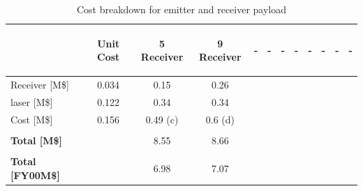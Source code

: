 \begin{table}[ht!]
\begin{tabular}{p{0.9in}|cccccccccc||c}
&\begin{sideways}Unit Cost\end{sideways} 
&\begin{sideways}5 Receiver\end{sideways} 
&\begin{sideways}9 Receiver\end{sideways} 
&\begin{sideways}-\end{sideways} 
&\begin{sideways}-\end{sideways}
&\begin{sideways}-\end{sideways} 
&\begin{sideways}-\end{sideways} 
&\begin{sideways}-\end{sideways} 
&\begin{sideways}-\end{sideways} 
&\begin{sideways}-\end{sideways}
&\begin{sideways}-\end{sideways}\\\hline
Receiver [M\$] &0.034 &0.15 &0.26 & & & & & & & & \\
\acs{laser} [M\$] &0.122 &0.34 &0.34 & & & & & & & & \\\hline\hline
Cost [M\$] &0.156 &0.49 (c) &0.6 (d) & & & & & & & &\\\hline\hline\\
\textbf{Total [M\$]} & &8.55 &8.66 & & & & & & & &\\\hline\\
\textbf{Total [FY00M\$]} & &6.98 &7.07 & & & & & & & &\\
\end{tabular}
\caption{Cost breakdown for emitter and receiver payload}
\label{tab:cost_payload}
\end{table}